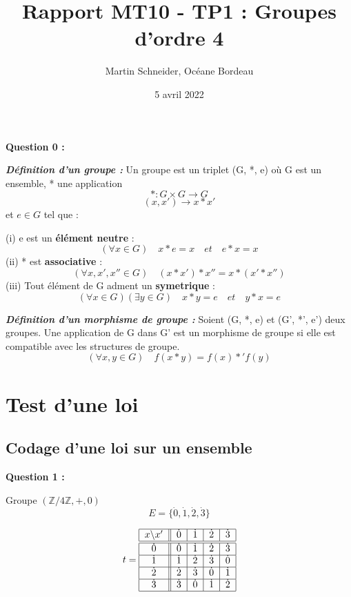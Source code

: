 \documentclass[titlepage]{article}
\title{Rapport MT10 - TP1 : Groupes d’ordre 4}
\author{Martin Schneider, Océane Bordeau}
\date{5 avril 2022}
\begin{document}
    \maketitle
    \tableofcontents
    \pagebreak
    \textbf{Question 0 :}

    \textbf{\emph{Définition d'un groupe :}} Un groupe est un triplet (G, *, e) où G est un ensemble, * une application
    \[*:G \times G \longrightarrow G\]
    \[(x, x') \longrightarrow x*x'\]
    et $e \in G$ tel que : 

    (i) e est un \textbf{élément neutre} : \[(\forall x \in G) \quad x*e=x \quad et \quad e*x=x\]
    (ii) * est \textbf{associative} : \[(\forall x, x', x'' \in G) \quad (x*x')*x''=x*(x'*x'')\]
    (iii) Tout élément de G adment un \textbf{symetrique} : \[(\forall x \in G)(\exists y \in G) \quad x*y=e \quad et \quad y*x=e\]

    \textbf{\emph{Définition d'un morphisme de groupe :}} Soient (G, *, e) et (G', *', e') deux groupes. 
    Une application de G dans G' est un morphisme de groupe si elle est compatible avec les structures de groupe.
    \[(\forall x, y \in G) \quad f(x*y)=f(x)*'f(y)\]

    \section{Test d'une loi}
        \subsection{Codage d'une loi sur un ensemble}
        \textbf{Question 1 :}

        Groupe $(\mathbb{Z}/4\mathbb{Z}, +, 0)$
        \[E = \{\dot{0}, \dot{1}, \dot{2}, \dot{3}\}\]

        \[t=\begin{tabular}{| c || c | c | c | c |}
            \hline
            $x$\textbackslash $x'$ & $\dot{0}$ & $\dot{1}$ & $\dot{2}$ & $\dot{3}$ \\ \hline \hline
            $\dot{0}$ & $\dot{0}$ & $\dot{1}$ & $\dot{2}$ & $\dot{3}$ \\ \hline
            $\dot{1}$ & $\dot{1}$ & $\dot{2}$ & $\dot{3}$ & $\dot{0}$ \\ \hline
            $\dot{2}$ & $\dot{2}$ & $\dot{3}$ & $\dot{0}$ & $\dot{1}$ \\ \hline
            $\dot{3}$ & $\dot{3}$ & $\dot{0}$ & $\dot{1}$ & $\dot{2}$ \\
            \hline
        \end{tabular}\]
\end{document}
